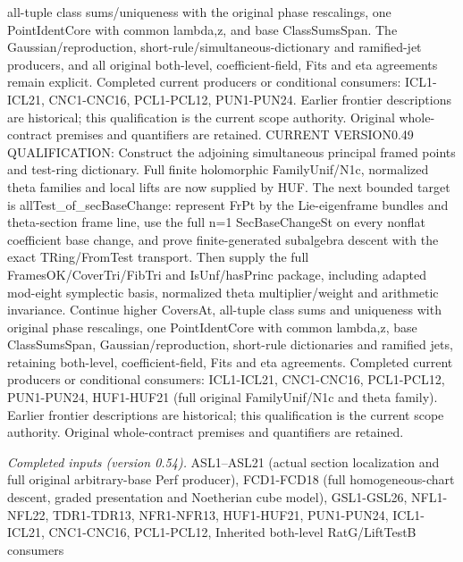 all-tuple class sums/uniqueness with the original phase rescalings, one PointIdentCore with common lambda,z, and base ClassSumsSpan. The Gaussian/reproduction, short-rule/simultaneous-dictionary and ramified-jet producers, and all original both-level, coefficient-field, Fits and eta agreements remain explicit. Completed current producers or conditional consumers: ICL1-ICL21, CNC1-CNC16, PCL1-PCL12, PUN1-PUN24. Earlier frontier descriptions are historical; this qualification is the current scope authority. Original whole-contract premises and quantifiers are retained. CURRENT VERSION0.49 QUALIFICATION: Construct the adjoining simultaneous principal framed points and test-ring dictionary. Full finite holomorphic FamilyUnif/N1c, normalized theta families and local lifts are now supplied by HUF. The next bounded target is allTest\_\allowbreak of\_\allowbreak secBaseChange: represent FrPt by the Lie-eigenframe bundles and theta-section frame line, use the full n=1 SecBaseChangeSt on every nonflat coefficient base change, and prove finite-generated subalgebra descent with the exact TRing/FromTest transport. Then supply the full FramesOK/CoverTri/FibTri and IsUnf/hasPrinc package, including adapted mod-eight symplectic basis, normalized theta multiplier/weight and arithmetic invariance. Continue higher CoversAt, all-tuple class sums and uniqueness with original phase rescalings, one PointIdentCore with common lambda,z, base ClassSumsSpan, Gaussian/reproduction, short-rule dictionaries and ramified jets, retaining both-level, coefficient-field, Fits and eta agreements. Completed current producers or conditional consumers: ICL1-ICL21, CNC1-CNC16, PCL1-PCL12, PUN1-PUN24, HUF1-HUF21 (full original FamilyUnif/N1c and theta family). Earlier frontier descriptions are historical; this qualification is the current scope authority. Original whole-contract premises and quantifiers are retained.

\emph{Completed inputs (version 0.54).} ASL1–ASL21 (actual section localization and full original arbitrary-base Perf producer), FCD1-FCD18 (full homogeneous-chart descent, graded presentation and Noetherian cube model), GSL1-GSL26, NFL1-NFL22, TDR1-TDR13, NFR1-NFR13, HUF1-HUF21, PUN1-PUN24, ICL1-ICL21, CNC1-CNC16, PCL1-PCL12, Inherited both-level RatG/LiftTestB consumers

